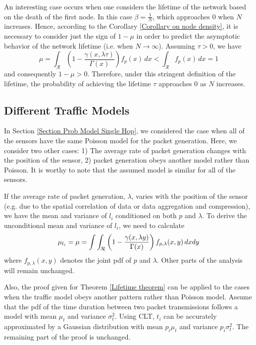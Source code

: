 \documentclass[conference]{IEEEtran}
\begin{document}
An interesting case occurs when one considers the lifetime of the
network based on the death of the first node. In this case $\beta =
\frac{1}{N}$, which approaches 0 when $N$ increases. Hence,
according to the Corollary \ref{Corollary on node density}, it is
necessary to consider just the sign of $1 - \mu$ in order to predict
the asymptotic behavior of the network lifetime (i.e. when
$N\rightarrow \infty$). Assuming $\tau > 0$, we have
\begin{equation}
\mu = \int_{\mathcal{R}} \left (1 - \frac{\gamma (x,\lambda
\tau)}{\Gamma(x)}\right) f_{p}(x)\,dx < \int_{\mathcal{R}}
f_{p}(x)\,dx = 1
\end{equation}
and consequently $1 - \mu > 0$. Therefore, under this stringent
definition of the lifetime, the probability of achieving the
lifetime $\tau$ approaches 0 as $N$ increases.

\subsection{Different Traffic Models}
In Section \ref{Section Prob Model Single Hop}, we considered the
case when all of the sensors have the same Poisson model for the
packet generation. Here, we consider two other cases: 1) The average
rate of packet generation changes with the position of the sensor,
2) packet generation obeys another model rather than Poisson. It is
worthy to note that the assumed model is similar for all of the
sensors.

If the average rate of packet generation, $\lambda$, varies with the
position of the sensor (e.g. due to the spatial correlation of data
or data aggregation and compression), we have the mean and variance
of $l_i$ conditioned on both $p$ and $\lambda$. To derive the
unconditional mean and variance of $l_i$, we need to calculate
\begin{equation}\label{joint lambda P}
\mu_{l_i} = \mu = \int \int_{\mathcal{R}} \left (1 - \frac{\gamma
(x,\lambda
y)}{\Gamma(x)}\right) f_{p,\lambda}(x,y)\,dx dy\\
\end{equation}
where $f_{p,\lambda}(x,y)$ denotes the joint pdf of $p$ and
$\lambda$. Other parts of the analysis will remain unchanged.

Also, the proof given for Theorem \ref{Lifetime theorem} can be
applied to the cases when the traffic model obeys another pattern
rather than Poisson model. Assume that the pdf of the time duration
between two packet transmissions follows a model with mean $\mu_t$
and variance $\sigma_t^2$. Using CLT, $t_i$ can be accurately
approximated by a Gaussian distribution with mean $p_i \mu_t$ and
variance $p_i \sigma_t^2$. The remaining part of the proof is
unchanged.
\end{document}
